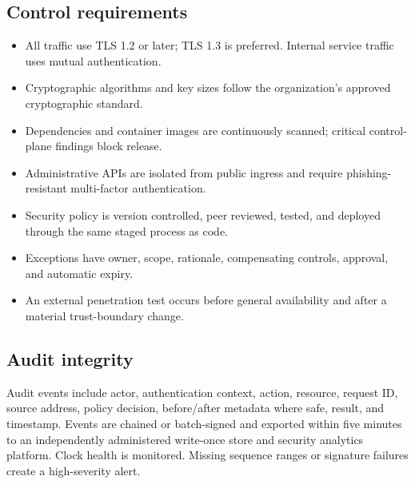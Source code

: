 \subsection{Control requirements}

\begin{itemize}
  \item All traffic \must use TLS 1.2 or later; TLS 1.3 is preferred. Internal service traffic uses mutual authentication.
  \item Cryptographic algorithms and key sizes follow the organization's approved cryptographic standard.
  \item Dependencies and container images are continuously scanned; critical control-plane findings block release.
  \item Administrative APIs are isolated from public ingress and require phishing-resistant multi-factor authentication.
  \item Security policy is version controlled, peer reviewed, tested, and deployed through the same staged process as code.
  \item Exceptions have owner, scope, rationale, compensating controls, approval, and automatic expiry.
  \item An external penetration test occurs before general availability and after a material trust-boundary change.
\end{itemize}

\subsection{Audit integrity}

Audit events include actor, authentication context, action, resource, request ID, source
address, policy decision, before/after metadata where safe, result, and timestamp.
Events are chained or batch-signed and exported within five minutes to an independently
administered write-once store and security analytics platform. Clock health is monitored.
Missing sequence ranges or signature failures create a high-severity alert.

